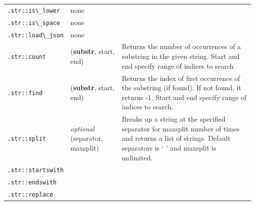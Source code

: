 {\begin{table}[t]
\begin{tabular}{l p{3cm} p{6cm}}
            \lstinline{.str::is\_lower}  & none                                          &                                                                                                                        \\
            \lstinline{.str::is\_space}  & none                                          &                                                                                                                        \\
            \lstinline{.str::load\_json} & none                                          &                                                                                                                        \\
            \lstinline{.str::count}      & (\textbf{substr}, start, end) & Returns the number of occurrences of a substring in the given string. Start and end specify range of indices to search \\
            \lstinline{.str::find}       &   (\textbf{substr}, start, end)                                             &    Returns the index of first occurrence of the substring (if found). If not found, it returns -1. Start and end specify range of indices to search.                                                                                                                   \\
            \lstinline{.str::split}      & \emph{optional} (separator, maxsplit)                                     &   Breaks up a string at the specified separator for maxsplit number of times and returns a list of strings. Default separators is ` ' and maxsplit is unlimited.                                                                                                                   \\
            \lstinline{.str::startswith} &                                               &                                                                                                                        \\
            \lstinline{.str::endswith}   &                                               &                                                                                                                        \\
            \lstinline{.str::replace}    &                                               &                                                                                                                        \\

\end{tabular}
\end{table}}
